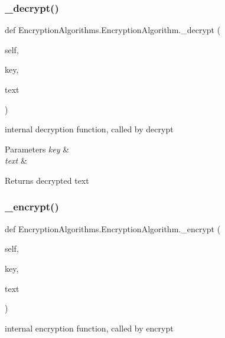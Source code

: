 \subsubsection{\texorpdfstring{\+\_\+decrypt()}{\_decrypt()}}
{\footnotesize\ttfamily def Encryption\+Algorithms.\+Encryption\+Algorithm.\+\_\+decrypt (\begin{DoxyParamCaption}\item[{}]{self,  }\item[{}]{key,  }\item[{}]{text }\end{DoxyParamCaption})\hspace{0.3cm}{\ttfamily [private]}}



internal decryption function, called by decrypt 


\begin{DoxyParams}{Parameters}
{\em key} & \\
\hline
{\em text} & \\
\hline
\end{DoxyParams}
\begin{DoxyReturn}{Returns}
decrypted text 
\end{DoxyReturn}
\mbox{\label{classEncryptionAlgorithms_1_1EncryptionAlgorithm_ab69e2900b19527168901b083b4eb4ec4}} 
\subsubsection{\texorpdfstring{\+\_\+encrypt()}{\_encrypt()}}
{\footnotesize\ttfamily def Encryption\+Algorithms.\+Encryption\+Algorithm.\+\_\+encrypt (\begin{DoxyParamCaption}\item[{}]{self,  }\item[{}]{key,  }\item[{}]{text }\end{DoxyParamCaption})\hspace{0.3cm}{\ttfamily [private]}}



internal encryption function, called by encrypt 


